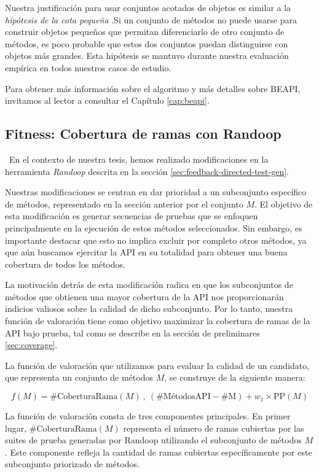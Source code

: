 Nuestra justificación para usar conjuntos acotados de objetos es similar a la \emph{hipótesis de la cota pequeña} \cite{Andoni:2003}.Si un conjunto de métodos no puede usarse para construir objetos pequeños que permitan diferenciarlo de otro conjunto de métodos, es poco probable que estos dos conjuntos puedan distinguirse con objetos más grandes. Esta hipótesis se mantuvo durante nuestra evaluación empírica en todos nuestros casos de estudio.

Para obtener más información sobre el algoritmo y más detalles sobre BEAPI, invitamos al lector a consultar el Capítulo \ref{cap:beapi}.


\subsection{Fitness: Cobertura de ramas con Randoop}
\
En el contexto de nuestra tesis, hemos realizado modificaciones en la herramienta \emph{Randoop} descrita en la sección \ref{sec:feedback-directed-test-gen}.

Nuestras modificaciones se centran en dar prioridad a un subconjunto específico de métodos, representado en la sección anterior por el conjunto $M$. El objetivo de esta modificación es generar secuencias de pruebas que se enfoquen principalmente en la ejecución de estos métodos seleccionados. Sin embargo, es importante destacar que esto no implica excluir por completo otros métodos, ya que aún buscamos ejercitar la API en su totalidad para obtener una buena cobertura de todos los métodos.

La motivación detrás de esta modificación radica en que los subconjuntos de métodos que obtienen una mayor cobertura de la API nos proporcionarán indicios valiosos sobre la calidad de dicho subconjunto. Por lo tanto, nuestra función de valoración tiene como objetivo maximizar la cobertura de ramas de la API bajo prueba, tal como se describe en la sección de preliminares \ref{sec:coverage}.

La función de valoración que utilizamos para evaluar la calidad de un candidato, que representa un conjunto de métodos $M$, se construye de la siguiente manera:

{\small
\[
f(M) = \text{{\#CoberturaRama}}(M) \ , \ (\text{{\#MétodosAPI}} - \text{{\#M}}) + w_1 \times \text{{PP}}(M)
\]
}

La función de valoración consta de tres componentes principales. En primer lugar, $\text{{\#CoberturaRama}}(M)$ representa el número de ramas cubiertas por las suites de prueba generadas por Randoop utilizando el subconjunto de métodos $M$. Este componente refleja la cantidad de ramas cubiertas específicamente por este subconjunto priorizado de métodos.

